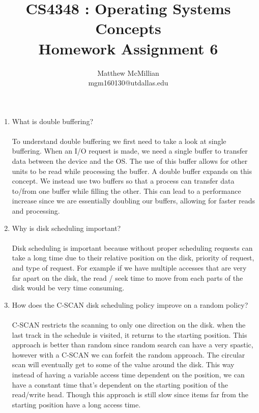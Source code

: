 \documentclass[12pt]{article}
\begin{document}
\title{CS4348 : Operating Systems Concepts\\Homework Assignment 6}
\author{Matthew McMillian\\mgm160130@utdallas.edu}
\maketitle

\begin{enumerate}

	\item What is double buffering? \\ \\
	To understand double buffering we first need to take a look at single buffering. When an I/O request is made, we need a single buffer to transfer data between the device and the OS. The use of this buffer allows for other units to be read while processing the buffer. A double buffer expands on this concept. We instead use two buffers so that a process can transfer data to/from one buffer while filling the other. This can lead to a performance increase since we are essentially doubling our buffers, allowing for faster reads and processing.\\
	
	\item Why is disk scheduling important? \\ \\
	Disk scheduling is important because without proper scheduling requests can take a long time due to their relative position on the disk, priority of request, and type of request. For example if we have multiple accesses that are very far apart on the disk, the read / seek time to move from each parts of the disk would be very time consuming.\\
	
	\item How does the C-SCAN disk scheduling policy improve on a random policy?  \\ \\
	C-SCAN restricts the scanning to only one direction on the disk. when the last track in the schedule is visited, it returns to the starting position. This approach is better than random since random search can have a very spastic, however with a C-SCAN we can forfeit the random approach. The circular scan will eventually get to some of the value around the disk. This way instead of having a variable access time dependent on the position, we can have a constant time that's dependent on the starting position of the read/write head. Though this approach is still slow since items far from the starting position have a long access time.
	\pagebreak
	

\end{enumerate}
\end{document}
